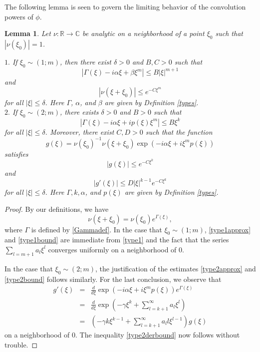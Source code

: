 \documentclass{article}
\theoremstyle{theorem}
\newtheorem{lemma}[theorem]{Lemma}
\theoremstyle{remark}
\begin{document}
\noindent The following lemma is seen to govern the limiting behavior of the convolution powers of $\phi$.

\begin{lemma}\label{typeslemma}
Let $\nu:\mathbb{R}\rightarrow\mathbb{C}$ be analytic on a neighborhood of a point $\xi_0$ such that $|\nu(\xi_0)|=1$.

\noindent $1.$ If $\xi_0\sim(1;m)$, then there exist $\delta>0$ and $B,C>0$ such that
\begin{equation}\label{type1approx}
|\Gamma(\xi)-i\alpha\xi+\beta\xi^m|\leq B|\xi|^{m+1}
\end{equation}
and
\begin{equation}\label{type1bound}
|\nu(\xi+\xi_0)|\leq e^{-C\xi^m}
\end{equation}
for all $|\xi|\leq\delta$. Here $\Gamma$, $\alpha$, and $\beta$ are given by Definition \ref{types}.\\

\noindent $2.$ If $\xi_0\sim(2;m)$, there exists $\delta>0$ and $B>0$ such that
\begin{equation}\label{type2approx}
|\Gamma(\xi)-i\alpha\xi+ip(\xi)\xi^m|\leq B\xi^{k}
\end{equation}
for all $|\xi|\leq \delta$. Moreover, there exist $C,D>0$ such that the function
\begin{equation*}
 g(\xi)=\nu(\xi_0)^{-1}\nu
(\xi+\xi_0)\exp(-i\alpha\xi+i\xi^mp(\xi))
\end{equation*}
satisfies
\begin{equation}\label{type2bound}
 |g(\xi)|\leq e^{-C\xi^k}
\end{equation}
and 
\begin{equation}\label{type2derbound}
|g'(\xi)|\leq D|\xi|^{k-1}e^{-C\xi^k}
\end{equation}
for all $|\xi|\leq \delta$. Here $\Gamma, k, \alpha$, and $p(\xi)$ are given by Definition \ref{types}.
\end{lemma}

\begin{proof}
By our definitions, we have
\begin{equation*}
\nu(\xi+\xi_0)=\nu(\xi_0)e^{\Gamma(\xi)},
\end{equation*}
where $\Gamma$ is defined by \eqref{Gammadef}.
In the case that $\xi_0\sim(1;m)$, \eqref{type1approx} and \eqref{type1bound} are immediate from \eqref{type1} and the fact that the series $\sum_{l=m+1}a_l\xi^l$ converges uniformly on a neighborhood of $0$.

In the case that $\xi_0\sim(2;m)$, the justification of the estimates \eqref{type2approx} and \eqref{type2bound} follows similarly. For the last conclusion, we observe that
\begin{eqnarray*}
 g'(\xi)&=&\frac{d}{d\xi}\exp(-i\alpha\xi+i\xi^m p(\xi))e^{\Gamma(\xi)}\\
&=&\frac{d}{d\xi}\exp{\left(-\gamma\xi^k+\sum_{l=k+1}^{\infty}a_l\xi^l\right)}\\
&=&\left(-\gamma k\xi^{k-1}+\sum_{l=k+1}^{\infty}a_ll\xi^{l-1}\right)g(\xi)
\end{eqnarray*}
on a neighborhood of $0$. The inequality \eqref{type2derbound} now follows without trouble.
\end{proof}
\end{document}
